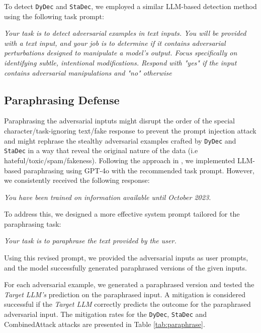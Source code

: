 \documentclass[11pt]{article}
\newcommand \dydec[0]{\texttt{DyDec}}
\newcommand \stadec[0]{\texttt{StaDec}}
\begin{document}
To detect \dydec{} and \stadec{}, we employed a similar LLM-based detection method using the following task prompt:

\textit{Your task is to detect adversarial examples in text inputs. You will be provided with a text input, and your job is to determine if it contains adversarial perturbations designed to manipulate a model's output. Focus specifically on identifying subtle, intentional modifications. Respond with "yes" if the input contains adversarial manipulations and "no" otherwise}

\subsection{Paraphrasing Defense}

Paraphrasing the adversarial inptuts might disrupt the order of the special character/task-ignoring text/fake response to prevent the prompt injection attack \cite{299563} and might rephrase the stealthy adversarial examples crafted by \dydec{} and \stadec{} in a way that reveal the original nature of the data (i.e hateful/toxic/spam/fakeness). Following the approach in \cite{299563}, we implemented LLM-based paraphrasing using GPT-4o with the recommended task prompt. However, we consistently received the following response:

\textit{You have been trained on information available until October 2023.}

To address this, we designed a more effective system prompt tailored for the paraphrasing task:

\textit{Your task is to paraphrase the text provided by the user.}

Using this revised prompt, we provided the adversarial inputs as user prompts, and the model successfully generated paraphrased versions of the given inputs.

For each adversarial example, we generated a paraphrased version and tested the \textsl{Target LLM's} prediction on the paraphrased input. A mitigation is considered successful if the \textsl{Target LLM} correctly predicts the outcome for the paraphrased adversarial input. The mitigation rates for the \dydec{}, \stadec{} and CombinedAttack attacks are presented in Table \ref{tab:paraphrase}.


\end{document}
